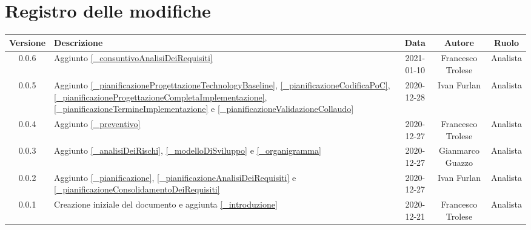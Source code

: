 \section*{Registro delle modifiche}

\begin{center}
	\begin{longtable}{|c|p{5cm}|c|c|c|}
		\hline
		\rowcolor{lighter-grayer}
		\textbf{Versione} & \textbf{Descrizione} & \textbf{Data} & \textbf{Autore} & \textbf{Ruolo} \\
		\hline
		\endfirsthead


		\hline
		0.0.6 & Aggiunto \ref{_consuntivoAnalisiDeiRequisiti} & 2021-01-10 & Francesco Trolese & Analista\\
		0.0.5 & Aggiunto \ref{_pianificazioneProgettazioneTechnologyBaseline}, \ref{_pianificazioneCodificaPoC}, \ref{_pianificazioneProgettazioneCompletaImplementazione}, \ref{_pianificazioneTermineImplementazione} e \ref{_pianificazioneValidazioneCollaudo} & 2020-12-28 & Ivan Furlan & Analista\\
		0.0.4 & Aggiunto \ref{_preventivo} & 2020-12-27 & Francesco Trolese & Analista\\
		0.0.3 & Aggiunto \ref{_analisiDeiRischi}, \ref{_modelloDiSviluppo} e \ref{_organigramma} & 2020-12-27 & Gianmarco Guazzo & Analista\\
		0.0.2 & Aggiunto \ref{_pianificazione}, \ref{_pianificazioneAnalisiDeiRequisiti} e \ref{_pianificazioneConsolidamentoDeiRequisiti}& 2020-12-27 & Ivan Furlan & Analista\\
		0.0.1 & Creazione iniziale del documento e aggiunta \ref{_introduzione} & 2020-12-21 & Francesco Trolese & Analista\\
		\hline
	\end{longtable}
\end{center}